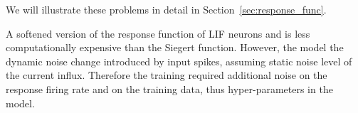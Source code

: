 	We will illustrate these problems in detail in Section~\ref{sec:response_func}. %

	A softened version of the response function of LIF neurons \DIFdelbegin {}\DIFdelend \DIFaddbegin {}\DIFaddend and is less computationally expensive than the Siegert function.
	However, the model \DIFdelbegin {}\DIFdelend \DIFaddbegin {}\DIFaddend the dynamic noise change introduced by input spikes, assuming \DIFaddbegin {}\DIFaddend static noise level of the current influx.
	Therefore the training required additional noise on the response firing rate and on the training data, thus \DIFdelbegin {}\DIFdelend \DIFaddbegin {}\DIFaddend hyper-parameters in the model.

